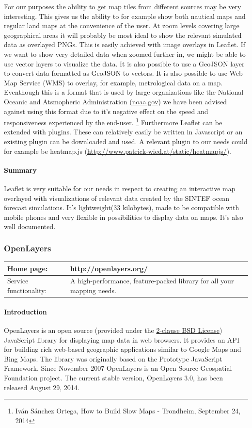 \documentclass[11pt,a4paper,titlepage,oneside]{report}
\begin{document}
    For our purposes the ability to get map tiles from different sources may be very interesting. This gives us the ability to for example show both nautical maps and regular land maps at the convenience of the user. At zoom levels covering large geographical areas it will probably be most ideal to show the relevant simulated data as overlayed PNGs. This is easily achieved with image overlays in Leaflet. If we want to show very detailed data when zoomed further in, we might be able to use vector layers to visualize the data. It is also possible to use a GeoJSON layer to convert data formatted as GeoJSON to vectors.
    It is also possible to use Web Map Service (WMS) to overlay, for example, metrological data on a map. Eventhough this is a format that is used by large organizations like the National Oceanic and Atsmopheric Administration (\url{noaa.gov}) we have been advised against using this format due to it's negative effect on the speed and responsiveness experienced by the end-user. \footnote{Iván Sánchez Ortega, How to Build Slow Maps - Trondheim, September 24, 2014}
    Furthermore Leaflet can be extended with plugins. These can relatively easily be written in Javascript or an existing plugin can be downloaded and used. A relevant plugin to our needs could for example be heatmap.js (\url{http://www.patrick-wied.at/static/heatmapjs/}).

    \paragraph{Summary}
    Leaflet is very suitable for our needs in respect to creating an interactive map overlayed with visualizations of relevant data created by the SINTEF ocean forecast simulations. It's lightweight(33 kilobytes), made to be compatible with mobile phones and very flexible in possibilities to display data on maps. It's also well documented.

  \subsubsection{OpenLayers}
   \begin{tabular}{|p{4cm}|p{8cm}|}
     \hline
     Home page: & \url{http://openlayers.org/} \\
     \hline
     Service functionality: & A high-performance, feature-packed library for all your mapping needs. \\
     \hline
   \end{tabular}
   \paragraph{Introduction} \indent
   OpenLayers is an open source (provided under the \href{'https://tldrlegal.com/license/bsd-2-clause-license-(freebsd)'}{2-clause BSD License}) JavaScript library for displaying map data in web browsers. It provides an API for building rich web-based geographic applications similar to Google Maps and Bing Maps. The library was originally based on the Prototype JavaScript Framework. Since November 2007 OpenLayers is an Open Source Geospatial Foundation project.
   The current stable version, OpenLayers 3.0, has been released August 29, 2014.
\end{document}
